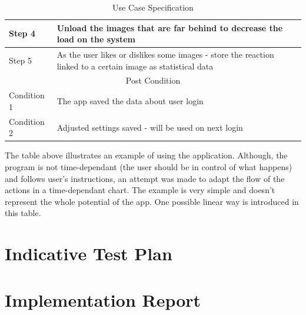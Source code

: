 \documentclass[12pt]{report}
\begin{document}
\begin{table}[h]
{\begin{tabular}{|lllll|}
                \multicolumn{1}{|l|}{Step 4}         & \multicolumn{4}{l|}{Unload the images that are far behind to decrease the load on the system}                                           \\ \hline
                \multicolumn{1}{|l|}{Step 5}         & \multicolumn{4}{l|}{As the user likes or dislikes some images - store the reaction linked to a certain image as statistical data}       \\ \hline
                \multicolumn{5}{|c|}{Post Condition}                                                                                                                                           \\ \hline
                \multicolumn{1}{|l|}{Condition 1}    & \multicolumn{4}{l|}{The app saved the data about user login}                                                                            \\ \hline
                \multicolumn{1}{|l|}{Condition 2}    & \multicolumn{4}{l|}{Adjusted settings saved - will be used on next login}                                                               \\ \hline
            \end{tabular}%
        }
        \caption{Use Case Specification}
    \end{table}

    The table above illustrates an example of using the application. Although, the program is not time-dependant (the user should be in control of what happens) and follows user's instructions, an attempt was made to adapt the flow of the actions in a time-dependant chart.
    The example is very simple and doesn't represent the whole potential of the app. One possible linear way is introduced in this table.

    \section*{Indicative Test Plan}
    \paragraph{}

    \section*{Implementation Report}
    \paragraph{}
\end{document}

